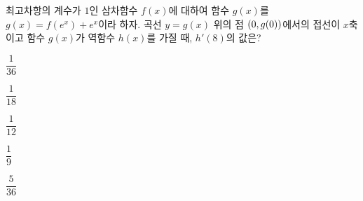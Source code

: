 최고차항의 계수가 $1$인 삼차함수 $f(x)$에 대하여 함수 $g(x)$를 $g(x)=f(e^x)+e^x$이라 하자. 곡선 $y=g(x)$ 위의 점 $(0{,}\mkern3mu\mathopen{}g(0))$에서의 접선이 $x$축이고 함수 $g(x)$가 역함수 $h(x)$를 가질 때, $h'(8)$의 값은?
\begin{choices32}{\rule[-3ex]{0pt}{8ex}$\dfrac{1}{36}$}{\rule[-3ex]{0pt}{8ex}$\dfrac{1}{18}$}{\rule[-3ex]{0pt}{8ex}$\dfrac{1}{12}$}{\rule[-3ex]{0pt}{8ex}$\dfrac{1}{9}$}{\rule[-3ex]{0pt}{8ex}$\dfrac{5}{36}$}\end{choices32}
